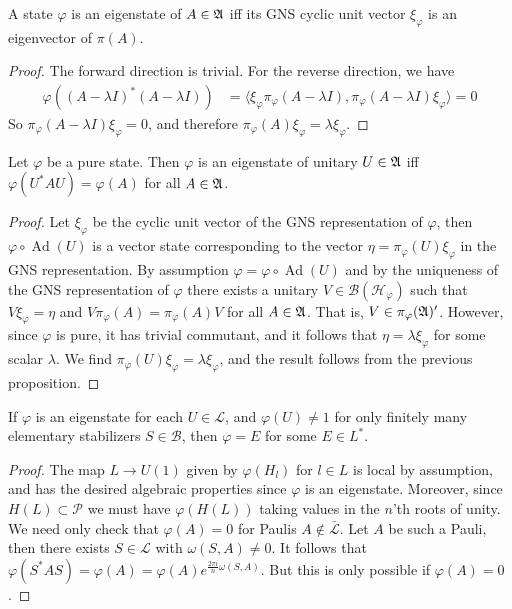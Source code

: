 \documentclass[11pt]{amsart}
\begin{document}
\begin{prop}
    A state $\varphi$ is an eigenstate of $A\in \mathfrak{A}$ iff its GNS cyclic unit vector $\xi_\varphi$ is an eigenvector of $\pi(A)$. 
    \begin{proof}
        The forward direction is trivial. For the reverse direction, we have 
        \begin{align*}
            \varphi((A-\lambda I)^*(A-\lambda I))&=\langle\xi_\varphi\pi_\varphi(A-\lambda I), \pi_\varphi(A-\lambda I)\xi_\varphi\rangle=0
        \end{align*}
        So $\pi_\varphi(A-\lambda I)\xi_\varphi=0$, and therefore $\pi_\varphi(A)\xi_\varphi=\lambda\xi_\varphi$.
    \end{proof}
\end{prop}
\begin{prop}
    Let $\varphi$ be a pure state. Then $\varphi$ is an eigenstate of unitary $U\in\mathfrak{A}$ iff $\varphi(U^*AU)=\varphi(A)$ for all $A\in\mathfrak{A}$.
    \begin{proof}
        Let $\xi_\varphi$ be the cyclic unit vector of the GNS representation of $\varphi$, then $\varphi\circ\operatorname{Ad}(U)$ is a vector state corresponding to the vector $\eta=\pi_\varphi(U)\xi_\varphi$ in the GNS representation. By assumption $\varphi=\varphi\circ\operatorname{Ad}(U)$ and by the uniqueness of the GNS representation of $\varphi$ there exists a unitary $V\in\mathcal B(\mathcal H_\varphi)$ such that $V\xi_\varphi=\eta$ and $V\pi_\varphi(A)=\pi_\varphi(A) V$ for all $A\in\mathfrak{A}$. That is, $V\in\pi_\varphi(\mathfrak{A})'$. However, since $\varphi$ is pure, it has trivial commutant, and it follows that $\eta=\lambda\xi_\varphi$ for some scalar $\lambda$. We find $\pi_\varphi(U)\xi_\varphi=\lambda\xi_\varphi$, and the result follows from the previous proposition.
    \end{proof}
\end{prop}
\begin{prop}\label{prop: omega_e describe all the local stabilizer eigenstates}
    If $\varphi$ is an eigenstate for each $U\in \mathcal L$, and $\varphi(U)\neq1$ for only finitely many elementary stabilizers $S\in \mathcal B$, then $\varphi=E$ for some $E\in L^*$.
    \begin{proof}
        The map $L\to U(1)$ given by $\varphi(H_l)$ for $l\in L$ is local by assumption, and has the desired algebraic properties since $\varphi$ is an eigenstate. Moreover, since $H(L)\subset\mathcal P$  we must have $\varphi(H(L))$ taking values in the $n$'th roots of unity. We need only check that $\varphi(A)=0$ for Paulis $A\notin\bar{\mathcal L}$. Let $A$ be such a Pauli, then there exists $S\in \mathcal L$ with $\omega(S,A)\neq0$. It follows that $\varphi(S^*AS)=\varphi(A)=\varphi(A)e^{\frac{2\pi i}{n}\omega(S,A)}$. But this is only possible if $\varphi(A)=0$. 
    \end{proof}
\end{prop}
\end{document}
